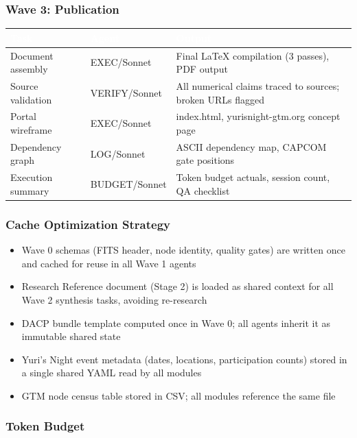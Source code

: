 \documentclass[11pt,letterpaper]{article}
\newcommand{\tableheader}[1]{\textbf{\sffamily\textcolor{white}{#1}}}
\begin{document}
\subsubsection{Wave 3: Publication}

\begin{center}
\begin{tabularx}{\textwidth}{L{4cm}L{2cm}X}
\toprule
{}
\tableheader{Task} & \tableheader{Agent} & \tableheader{Output} \\
\midrule
Document assembly & EXEC/Sonnet & Final LaTeX compilation (3 passes), PDF output \\
Source validation & VERIFY/Sonnet & All numerical claims traced to sources; broken URLs flagged \\
Portal wireframe & EXEC/Sonnet & index.html, yurisnight-gtm.org concept page \\
Dependency graph & LOG/Sonnet & ASCII dependency map, CAPCOM gate positions \\
Execution summary & BUDGET/Sonnet & Token budget actuals, session count, QA checklist \\
\bottomrule
\end{tabularx}
\end{center}

\subsubsection{Cache Optimization Strategy}

\begin{itemize}
  \item Wave 0 schemas (FITS header, node identity, quality gates) are written once and cached for reuse in all Wave 1 agents
  \item Research Reference document (Stage 2) is loaded as shared context for all Wave 2 synthesis tasks, avoiding re-research
  \item DACP bundle template computed once in Wave 0; all agents inherit it as immutable shared state
  \item Yuri's Night event metadata (dates, locations, participation counts) stored in a single shared YAML read by all modules
  \item GTM node census table stored in CSV; all modules reference the same file
\end{itemize}

\subsubsection{Token Budget}
\end{document}
